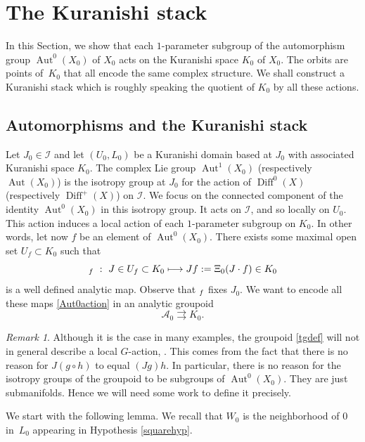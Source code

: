 \documentclass[JEP,XML,SOM,Unicode]{cedram}
\let\mathcal\mathscr
\newcommand{\NoChangel}[1]{%
\expandafter\let\csname old\string#1\endcsname=#1
\let#1=\relax
\newcommand{#1}{\mathcode`l="716C\csname old\string#1\endcsname\mathcode`l="7160 }%
}
\def\mto{\mathchoice{\longmapsto}{\mapsto}{\mapsto}{\mapsto}}
\DeclareMathOperator{\Aut}{Aut}
\DeclareMathOperator{\Diff}{Diff}
\DeclareMathOperator{\Hol}{Hol}\NoChangel{\Hol}
\theoremstyle{plain}
\theoremstyle{definition}
\theoremstyle{remark}
\newtheorem{remark}[theorem]{Remark}
\numberwithin{equation}{section}
\newcommand{\Azero}{\Aut^0(X_0)}
\newcommand{\cI}{\mathcal{I}}
\begin{document}
\section{The Kuranishi stack}
\label{Kuranishisection}
In this Section, we show that each $1$-parameter subgroup of the automorphism group $\Azero$ of $X_0$ acts on the Kuranishi space $K_0$ of $X_0$. The orbits are points of~$K_0$ that all encode the same complex structure. We shall construct a Kuranishi stack which is roughly speaking the quotient of $K_0$ by all these actions.

\subsection{Automorphisms and the Kuranishi stack}
\label{localaction}
Let $J_0\in\cI$ and let $(U_0,L_0)$ be a Kuranishi domain based at $J_0$ with associated Kuranishi space $K_0$. The complex Lie group $\Aut^1(X_0)$ (respectively $\Aut(X_0)$) is the isotropy group at $J_0$ for the action of $\Diff^0(X)$ (respectively $\Diff^+(X)$) on $\cI$. We focus on the connected component of the identity $\Aut^0(X_0)$ in this isotropy group. It acts on $\cI$, and so locally on $U_0$. This action induces a local action of each $1$-parameter subgroup on $K_0$. In other words, let now $f$ be an element of $\Azero$. There exists some maximal open set $U_f\subset K_0$ such that
\begin{equation}
\label{Aut0action}
\Hol_f\ :\ J\in U_f\subset K_0\mto Jf:=\Xi_0(J\cdot f)\in K_0
\end{equation}
is a well defined analytic map. Observe that $\Hol_f$ fixes $J_0$. We want to encode all these maps \eqref{Aut0action} in an analytic groupoid
\begin{equation}
\label{tgdef}
\mathcal A_0\rightrightarrows K_0.
\end{equation}
\begin{remark}
\label{notanaction}
Although it is the case in many examples, the groupoid \eqref{tgdef} will not in general describe a local $G$-action, \cf \cite{An}. This comes from the fact that there is no reason for $J(g\circ h)$ to equal $(Jg)h$. In particular, there is no reason for the isotropy groups of the groupoid to be subgroups of $ \Aut^0(X_0)$. They are just submanifolds. Hence we will need some work to define it precisely.
\end{remark}
We start with the following lemma. We recall that $W_0$ is the neighborhood of $0$ in~$L_0$ appearing in Hypothesis \ref{squarehyp}.
\end{document}
